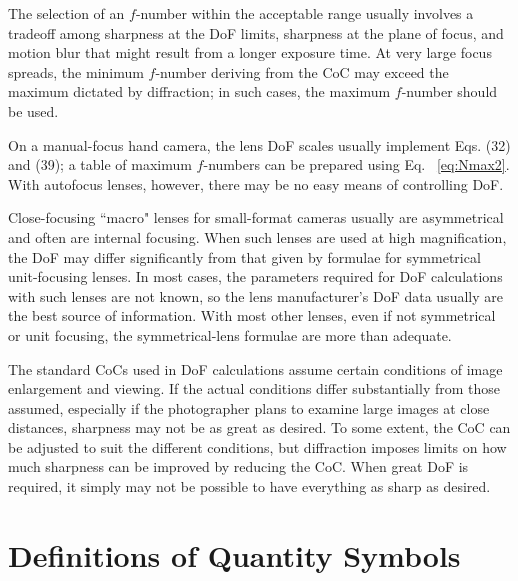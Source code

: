 \documentclass[11pt, oneside]{scrartcl}   	%
\begin{document}
The selection of an $f$-number within the acceptable range usually involves a tradeoff among sharpness at the DoF limits, sharpness at the plane of focus, and motion blur that might result from a longer exposure time. At very large focus spreads, the minimum $f$-number
deriving from the CoC may exceed the maximum dictated by diffraction; in such cases, the maximum $f$-number should be used.

On a manual-focus hand camera, the lens DoF scales usually implement Eqs. (32) and (39); a table of maximum $f$-numbers can be prepared using Eq. ~\ref{eq:Nmax2}. With autofocus lenses, however, there may be no easy means of controlling DoF.

Close-focusing ``macro" lenses for small-format cameras usually are asymmetrical and often are internal focusing. When such lenses are used at high magnification, the DoF may differ significantly from that given by formulae for symmetrical unit-focusing lenses. In most cases, the parameters required for DoF calculations with such lenses are not known, so the lens manufacturer’s DoF data usually are the best source of information. With most other lenses, even if not symmetrical or unit focusing, the symmetrical-lens formulae are more than adequate.

The standard CoCs used in DoF calculations assume certain conditions of image enlargement and viewing. If the actual conditions differ substantially from those assumed, especially if the photographer plans to examine large images at close distances, sharpness may not be as great as desired. To some extent, the CoC can be adjusted to suit the different conditions, but diffraction imposes limits on how much sharpness can be improved by reducing the CoC. When great DoF is required, it simply may not be possible to have everything as sharp as desired.

\section{Definitions of Quantity Symbols}
\end{document}
